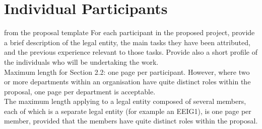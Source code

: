 \section{Individual Participants}\label{sec:partners}
\begin{todo}{from the proposal template}
For each participant in the proposed project, provide a brief description of the legal entity, the main
tasks they have been attributed, and the previous experience relevant to those tasks. Provide also a
short profile of the individuals who will be undertaking the work.\\
Maximum length for Section 2.2: one page per participant. However, where two or more departments within
an organisation have quite distinct roles within the proposal, one page per department is acceptable.\\
The maximum length applying to a legal entity composed of several members, each of which is a separate
legal entity (for example an EEIG1), is one page per member, provided that the members have quite distinct
roles within the proposal.
\end{todo}
\newpage
\newpage
\newpage
\newpage
\newpage
\newpage
\newpage
\newpage
\newpage
\newpage
\newpage
\newpage
\newpage
\newpage
\newpage
\newpage
\newpage
\newpage
\newpage
\newpageS
\newpageT
\newpage

